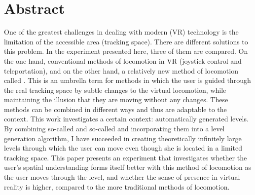 \chapter*{Abstract}
One of the greatest challenges in dealing with modern  (VR) technology is the limitation of the accessible area (tracking space).
There are different solutions to this problem. In the experiment presented here, three of them are compared. On the one hand, conventional methods of locomotion in VR (joystick control and teleportation), and on the other hand, a relatively new method of locomotion called . This is an umbrella term for methods in which the user is guided through the real tracking space by subtle changes to the virtual locomotion, while maintaining the illusion that they are moving without any changes. These methods can be combined in different ways and thus are adaptable to the context. This work investigates a certain context: automatically generated levels. By combining so-called  and so-called  and incorporating them into a level generation algorithm, I have succeeded in creating theoretically infinitely large levels through which the user can move even though she is located in a limited tracking space. This paper presents an experiment that investigates whether the user's spatial understanding forms itself better with this method of locomotion as the user moves through the level, and whether the sense of presence in virtual reality is higher, compared to the more traditional methods of locomotion. %